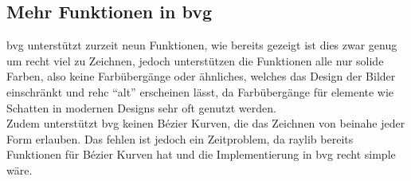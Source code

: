 \subsection{Mehr Funktionen in bvg}
bvg unterstützt zurzeit neun Funktionen, wie bereits gezeigt ist dies zwar genug um recht viel zu Zeichnen, jedoch unterstützen die Funktionen alle nur solide Farben, also keine Farbübergänge oder ähnliches, welches das Design der Bilder einschränkt und rehc ``alt'' erscheinen lässt, da Farbübergänge für elemente wie Schatten in modernen Designs sehr oft genutzt werden.\\
Zudem unterstützt bvg keinen Bézier Kurven, die das Zeichnen von beinahe jeder Form erlauben. Das fehlen ist jedoch ein Zeitproblem, da raylib bereits Funktionen für Bézier Kurven hat und die Implementierung in bvg recht simple wäre.
